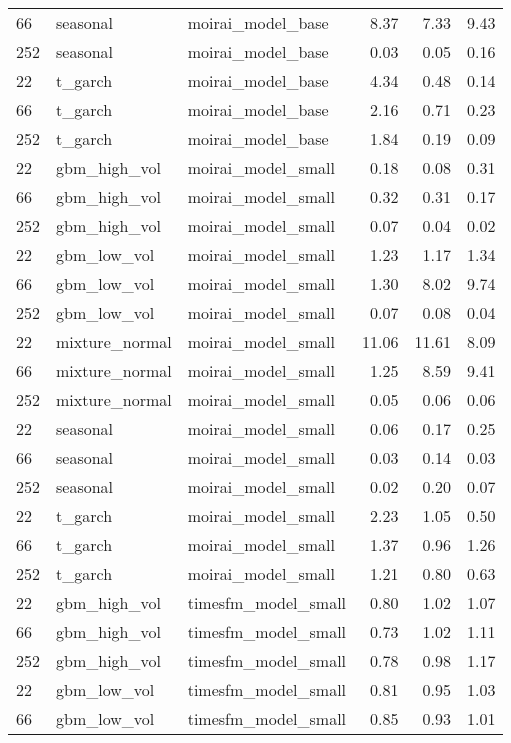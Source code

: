 {\begin{tabular}{lllrrr}
66 & seasonal & moirai\_model\_base & 8.37 & 7.33 & 9.43 \\
252 & seasonal & moirai\_model\_base & 0.03 & 0.05 & 0.16 \\
\midrule
22 & t\_garch & moirai\_model\_base & 4.34 & 0.48 & 0.14 \\
66 & t\_garch & moirai\_model\_base & 2.16 & 0.71 & 0.23 \\
252 & t\_garch & moirai\_model\_base & 1.84 & 0.19 & 0.09 \\
\midrule
22 & gbm\_high\_vol & moirai\_model\_small & 0.18 & 0.08 & 0.31 \\
66 & gbm\_high\_vol & moirai\_model\_small & 0.32 & 0.31 & 0.17 \\
252 & gbm\_high\_vol & moirai\_model\_small & 0.07 & 0.04 & 0.02 \\
\midrule
22 & gbm\_low\_vol & moirai\_model\_small & 1.23 & 1.17 & 1.34 \\
66 & gbm\_low\_vol & moirai\_model\_small & 1.30 & 8.02 & 9.74 \\
252 & gbm\_low\_vol & moirai\_model\_small & 0.07 & 0.08 & 0.04 \\
\midrule
22 & mixture\_normal & moirai\_model\_small & 11.06 & 11.61 & 8.09 \\
66 & mixture\_normal & moirai\_model\_small & 1.25 & 8.59 & 9.41 \\
252 & mixture\_normal & moirai\_model\_small & 0.05 & 0.06 & 0.06 \\
\midrule
22 & seasonal & moirai\_model\_small & 0.06 & 0.17 & 0.25 \\
66 & seasonal & moirai\_model\_small & 0.03 & 0.14 & 0.03 \\
252 & seasonal & moirai\_model\_small & 0.02 & 0.20 & 0.07 \\
\midrule
22 & t\_garch & moirai\_model\_small & 2.23 & 1.05 & 0.50 \\
66 & t\_garch & moirai\_model\_small & 1.37 & 0.96 & 1.26 \\
252 & t\_garch & moirai\_model\_small & 1.21 & 0.80 & 0.63 \\
\midrule
22 & gbm\_high\_vol & timesfm\_model\_small & 0.80 & 1.02 & 1.07 \\
66 & gbm\_high\_vol & timesfm\_model\_small & 0.73 & 1.02 & 1.11 \\
252 & gbm\_high\_vol & timesfm\_model\_small & 0.78 & 0.98 & 1.17 \\
\midrule
22 & gbm\_low\_vol & timesfm\_model\_small & 0.81 & 0.95 & 1.03 \\
66 & gbm\_low\_vol & timesfm\_model\_small & 0.85 & 0.93 & 1.01 \\

\end{tabular}}
